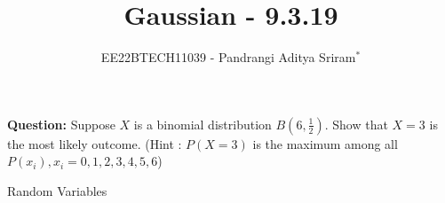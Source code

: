 \documentclass[journal,12pt,twocolumn]{IEEEtran}
\theoremstyle{remark}
\begin{document}

\vspace{3cm}

\title{Gaussian - 9.3.19}
\author{EE22BTECH11039 - Pandrangi Aditya Sriram$^{*}$%
}
\maketitle
\newpage
\bigskip

\renewcommand{\thefigure}{\theenumi}
\renewcommand{\thetable}{\theenumi}


\vspace{3cm}
\textbf{Question:} Suppose $X$ is a binomial distribution $B\left(6,\frac{1}{2}\right)$. Show that $X=3$ is the most likely outcome.
(Hint : $P(X=3)$ is the maximum among all $P(x_i),x_i=0,1,2,3,4,5,6$)\\
\solution
\begin{table}[h]
    
    \label{tab:9.3.19_table}
    \caption{Random Variables}
\end{table}
\end{document}
